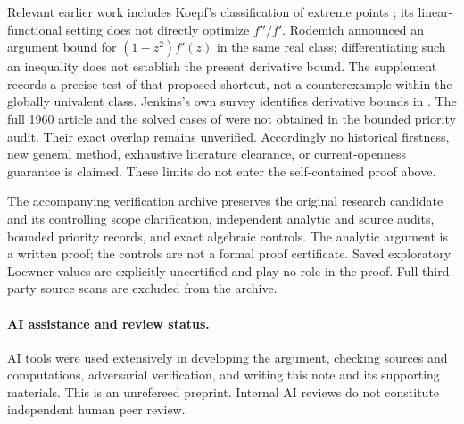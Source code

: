 \documentclass[11pt]{article}
\begin{document}
\noindent\begin{minipage}{\linewidth}
Relevant earlier work includes Koepf's classification of extreme points
\cite[Section~4]{Koepf}; its linear-functional setting does not directly
optimize $f''/f'$. Rodemich \cite{Rodemich} announced an argument bound for
$(1-z^2)f'(z)$ in the same real class; differentiating such an inequality
does not establish the present derivative bound. The supplement records a
precise test of that proposed shortcut, not a counterexample within the globally
univalent class. Jenkins's own survey \cite[p.~7]{Jenkins1962} identifies derivative
bounds in \cite{Jenkins1960}. The full 1960 article and the solved cases of
\cite{AlePop} were not obtained in the bounded priority audit. Their exact
overlap remains unverified. Accordingly no historical firstness, new general
method, exhaustive literature clearance, or current-openness guarantee is
claimed. These limits do not enter the self-contained proof above.
\end{minipage}

The accompanying verification archive preserves the original research
candidate and its controlling scope clarification, independent analytic and
source audits, bounded priority records, and exact algebraic controls.
The analytic argument is a written proof; the controls are not a formal
proof certificate. Saved exploratory Loewner values are explicitly
uncertified and play no role in the proof. Full third-party source scans
are excluded from the archive.

\paragraph{AI assistance and review status.}
AI tools were used extensively in developing the argument, checking sources
and computations, adversarial verification, and writing this note and its
supporting materials. This is an unrefereed preprint. Internal AI reviews do
not constitute independent human peer review.
\end{document}
